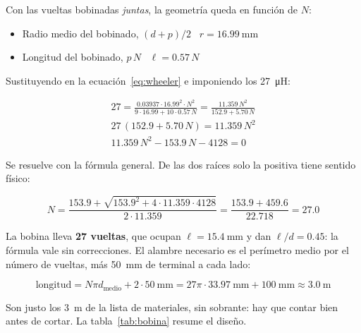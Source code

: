 \documentclass[11pt,a4paper]{article}
\begin{document}
\noindent Con las vueltas bobinadas \emph{juntas}, la geometría queda en función de $N$:

\begin{itemize}[leftmargin=1.4em, itemsep=1pt, topsep=4pt]
    \item Radio medio del bobinado, $(d + p)/2$
          \dotfill\ $r = \qty{16.99}{\milli\metre}$
    \item Longitud del bobinado, $p\,N$
          \dotfill\ $\ell = \num{0.57}\,N$
\end{itemize}

\noindent Sustituyendo en la ecuación~\eqref{eq:wheeler} e imponiendo los
\qty{27}{\micro\henry}:

\begin{gather*}
    27 = \frac{\num{0.03937} \cdot \num{16.99}^{2} \cdot N^{2}}
              {9 \cdot \num{16.99} + 10 \cdot \num{0.57}\,N}
       = \frac{\num{11.359}\,N^{2}}{\num{152.9} + \num{5.70}\,N}
    \\[14pt]
    27\,(\num{152.9} + \num{5.70}\,N) = \num{11.359}\,N^{2}
    \\[14pt]
    \num{11.359}\,N^{2} - \num{153.9}\,N - \num{4128} = 0
\end{gather*}

\noindent Se resuelve con la fórmula general. De las dos raíces solo la positiva tiene
sentido físico:

\begin{equation*}
    N = \frac{\num{153.9} + \sqrt{\num{153.9}^{2} + 4 \cdot \num{11.359} \cdot \num{4128}}}
             {2 \cdot \num{11.359}}
      = \frac{\num{153.9} + \num{459.6}}{\num{22.718}}
      = \num{27.0}
\end{equation*}

\noindent La bobina lleva \textbf{27 vueltas}, que ocupan
$\ell = \qty{15.4}{\milli\metre}$ y dan $\ell/d = \num{0.45}$: la fórmula vale sin
correcciones. El alambre necesario es el perímetro medio por el número de vueltas, más
\qty{50}{\milli\metre} de terminal a cada lado:

\begin{equation*}
    \text{longitud} = N \pi d_{\text{medio}} + 2 \cdot \qty{50}{\milli\metre}
                    = 27 \pi \cdot \qty{33.97}{\milli\metre} + \qty{100}{\milli\metre}
                    \approx \qty{3.0}{\metre}
\end{equation*}

\noindent Son justo los \qty{3}{\metre} de la lista de materiales, sin sobrante: hay
que contar bien antes de cortar. La tabla~\ref{tab:bobina} resume el diseño.
\end{document}
